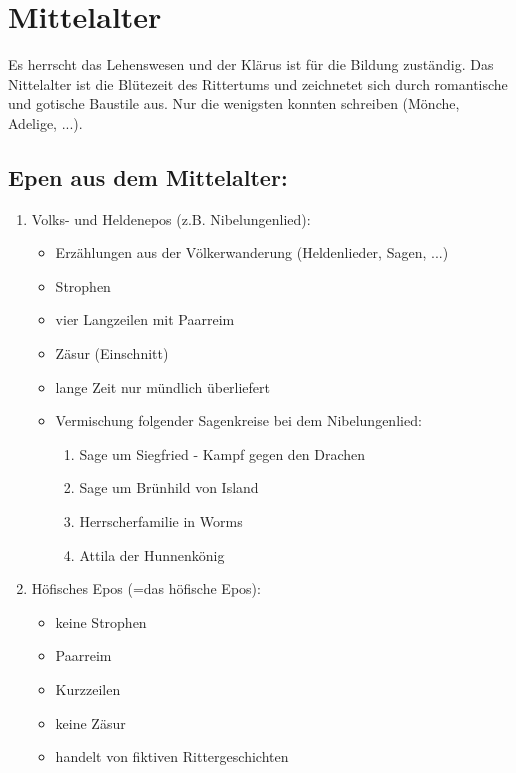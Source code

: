 \documentclass[12pt,a4paper]{article}
\begin{document}
\newpage	
	
\section{Mittelalter}	

Es herrscht das Lehenswesen und der Klärus ist für die Bildung zuständig.
Das Nittelalter ist die Blütezeit des Rittertums und zeichnetet sich durch romantische und gotische Baustile aus.
Nur die wenigsten konnten schreiben (Mönche, Adelige, ...).	

\subsection{Epen aus dem Mittelalter:}

	\begin{enumerate}
		\item Volks- und Heldenepos (z.B. Nibelungenlied):
			\begin{itemize}
			\item Erzählungen aus der Völkerwanderung (Heldenlieder, Sagen, ...)
			\item Strophen
			\item vier Langzeilen mit Paarreim
			\item Zäsur (Einschnitt)
			\item lange Zeit nur mündlich überliefert
			\item Vermischung folgender Sagenkreise bei dem Nibelungenlied:
			
				\begin{enumerate}
				\item Sage um Siegfried - Kampf gegen den Drachen
				\item Sage um Brünhild von Island
				\item Herrscherfamilie in Worms
				\item Attila der Hunnenkönig
				\end{enumerate}
			
			\end{itemize}
			
		\item Höfisches Epos (=das höfische Epos):
			\begin{itemize}
			\item keine Strophen
			\item Paarreim
			\item Kurzzeilen
			\item keine Zäsur
			\item handelt von fiktiven Rittergeschichten
			\end{itemize}						
	

\end{enumerate}
\end{document}
